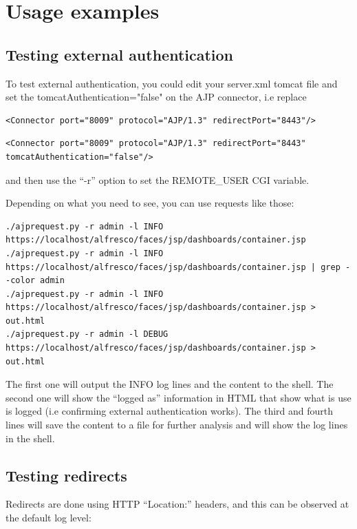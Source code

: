 \documentclass[12pt,a4]{article}
\begin{document}
\section{Usage examples}

\subsection{Testing external authentication}

To test external authentication, you could edit your server.xml tomcat file and set the tomcatAuthentication="false" on the AJP connector, i.e replace

\begin{verbatim}
<Connector port="8009" protocol="AJP/1.3" redirectPort="8443"/>
\end{verbatim}

\begin{verbatim}
<Connector port="8009" protocol="AJP/1.3" redirectPort="8443" tomcatAuthentication="false"/>
\end{verbatim}

and then use the ``-r'' option to set the REMOTE\_USER CGI variable.


Depending on what you need to see, you can use requests like those:
\begin{verbatim}
./ajprequest.py -r admin -l INFO https://localhost/alfresco/faces/jsp/dashboards/container.jsp 
./ajprequest.py -r admin -l INFO https://localhost/alfresco/faces/jsp/dashboards/container.jsp | grep --color admin
./ajprequest.py -r admin -l INFO https://localhost/alfresco/faces/jsp/dashboards/container.jsp > out.html
./ajprequest.py -r admin -l DEBUG https://localhost/alfresco/faces/jsp/dashboards/container.jsp > out.html
\end{verbatim}
The first one will output the INFO log lines and the content to the shell.
The second one will show the ``logged as'' information in HTML that show what is use is logged (i.e confirming external authentication works). The third and fourth lines will save the content to a file for further analysis and will show the log lines in the shell.


\subsection{Testing redirects}

Redirects are done using HTTP ``Location:'' headers, and this can be observed at the default log level:
\end{document}
